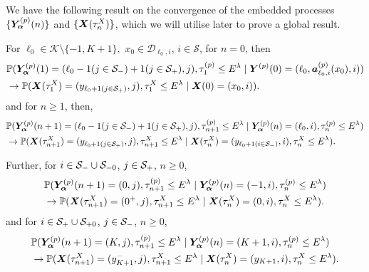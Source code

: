 We have the following result on the convergence of the embedded processes \(\{\bm{Y}_{\bm{\alpha}}^{(p)}(n)\}\) and \(\{\boldsymbol X(\tau_n^X)\}\), which we will utilise later to prove a global result.
\begin{cor}\label{cor: aln222222} For \(\ell_0\in \mathcal K \setminus \{-1,K+1\},\) \(x_0\in\mathcal D_{\ell_0,i}\), \(i\in\mathcal S\), 
	for \(n=0\), then
	\begin{align}
		&\mathbb P(\bm{Y}_{\bm{\alpha}}^{(p)}(1) = (\ell_0-1(j\in\mathcal{S}_-)+1(j\in\mathcal{S}_+),j), \tau_1^{(p)}\leq E^\lambda
            	 \mid \boldsymbol Y^{(p)}(0) = (\ell_0,\boldsymbol a_{\ell_0,i}^{(p)}(x_0),i)) \nonumber
		\\&\to  
			\mathbb P(\boldsymbol X(\tau_1^X) = (y_{\ell_0+1(j\in\mathcal{S}_+)}, j), \tau_1^{X}\leq E^\lambda \mid \boldsymbol X(0) = (x_0,i)).\label{eqn: lim 1}
	\end{align}
	and for \(n\geq 1\), then, 
	\begin{align}
		&\mathbb P(\bm{Y}_{\bm{\alpha}}^{(p)}(n+1) = (\ell_0-1(j\in\mathcal{S}_-)+1(j\in\mathcal{S}_+),j), \tau_{n+1}^{(p)}\leq E^\lambda
            	 \mid \bm{Y}_{\bm{\alpha}}^{(p)}(n) = (\ell_0,i), \tau_n^{(p)}\leq E^\lambda) \nonumber
		\\&\to  
			\mathbb P(\boldsymbol X(\tau_{n+1}^X) = (y_{\ell_0+1(j\in\mathcal{S}_+)}, j), \tau_{n+1}^{X}\leq E^\lambda \mid \boldsymbol X(\tau_{n}^X) = (y_{\ell_0+1(i\in\mathcal{S}_-)},i), \tau_n^{X}\leq E^\lambda).\label{eqn: ddddddd}
	\end{align}

	Further, for \(i\in\mathcal S_-\cup\mathcal{S}_{-0}\), \(j\in\mathcal{S}_+\), \(n\geq 0\), 
	\begin{align}
		&\mathbb P(\bm{Y}_{\bm{\alpha}}^{(p)}(n+1) = (0,j), \tau_{n+1}^{(p)}\leq E^\lambda
            	 \mid \bm{Y}_{\bm{\alpha}}^{(p)}(n) = (-1,i), \tau_n^{(p)}\leq E^\lambda) \nonumber
		\\&\to  
			\mathbb P(\boldsymbol X(\tau_{n+1}^X) = (0^+, j), \tau_{n+1}^{X}\leq E^\lambda \mid \boldsymbol X(\tau_{n}^X) = (0,i), \tau_n^{X}\leq E^\lambda).\label{eqn: ddddddd22}
	\end{align}
	and for \(i\in\mathcal S_+\cup\mathcal{S}_{+0}\), \(j\in\mathcal{S}_-\), \(n\geq 0\),
	\begin{align}
		&\mathbb P(\bm{Y}_{\bm{\alpha}}^{(p)}(n+1) = (K,j), \tau_{n+1}^{(p)}\leq E^\lambda
            	 \mid \bm{Y}_{\bm{\alpha}}^{(p)}(n) = (K+1,i), \tau_n^{(p)}\leq E^\lambda) \nonumber
		\\&\to  
			\mathbb P(\boldsymbol X(\tau_{n+1}^X) = (y_{K+1}^-, j), \tau_{n+1}^{X}\leq E^\lambda \mid \boldsymbol X(\tau_{n}^X) = (y_{K+1},i), \tau_n^{X}\leq E^\lambda).\label{eqn: ddddddd3}
	\end{align}
\end{cor}
